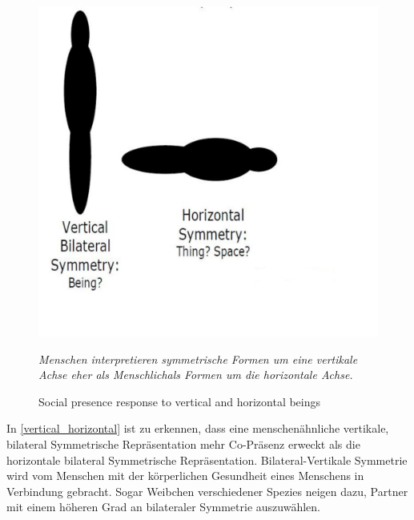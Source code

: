 \documentclass[a4paper,11pt]{article}%
\renewcommand{\\}{\vspace*{0.5\baselineskip} \newline}
\begin{document}
	\begin{figure}[H]
		\begin{footnotesize}
		\centering
			\includegraphics[scale= 0.4]{Abbildungen/Symmetry.JPG}
			\caption[Abbildung 1]{Social presence response to vertical and
horizontal beings}
			\textit{Menschen interpretieren symmetrische Formen um eine vertikale Achse eher als \flqq Menschlich\frqq als Formen um die horizontale Achse. \citep{biocca2002defining} }
			\label{vertical_horizontal}
		\end{footnotesize}
	\end{figure}

In \autoref{vertical_horizontal} ist zu erkennen, dass eine menschenähnliche vertikale, bilateral Symmetrische Repräsentation mehr Co-Präsenz erweckt als die horizontale bilateral Symmetrische Repräsentation. \citep[p.546-551]{thornhill1998relative}
Bilateral-Vertikale Symmetrie wird vom Menschen mit der körperlichen Gesundheit eines Menschens in Verbindung gebracht. Sogar Weibchen verschiedener Spezies neigen dazu, Partner mit einem höheren Grad an bilateraler Symmetrie auszuwählen. \citep[p. 659–669]{rhodes1998facial} \citep{biocca2002defining} \citep[p.233–242]{grammer1994human} \ \\
\end{document}
